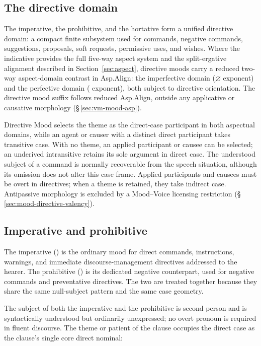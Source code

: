 \subsection{The directive domain}\label{sec:mood-directive}

The imperative, the prohibitive, and the hortative form a unified directive
domain: a compact finite subsystem used for commands, negative commands,
suggestions, proposals, soft requests, permissive uses, and wishes. Where the
indicative provides the full five-way aspect system and the split-ergative
alignment described in Section~\ref{sec:aspect}, directive moods carry a reduced
two-way aspect-domain contrast in Asp.Align: the imperfective domain
($\varnothing$ exponent) and the perfective domain
( exponent), both subject to directive orientation. The directive mood suffix follows
reduced Asp.Align, outside any applicative or causative morphology
(§\,\ref{sec:vm-mood-asp}).

Directive Mood selects the theme as the direct-case participant in both
aspectual domains, while an agent or causer with a distinct direct participant
takes transitive case. With no theme, an applied participant or causee can be
selected; an underived intransitive retains its sole argument in direct case.
The understood subject of a command is normally recoverable from the speech
situation, although its omission does not alter this case frame. Applied
participants and causees must be overt in directives; when a theme is retained,
they take indirect case. Antipassive morphology is excluded by a Mood--Voice
licensing restriction (§\,\ref{sec:mood-directive-valency}).

\subsection{Imperative and prohibitive}\label{sec:mood-imp}

The imperative () is the ordinary mood for direct commands,
instructions, warnings, and immediate discourse-management directives addressed
to the hearer. The prohibitive () is its dedicated negative counterpart,
used for negative commands and preventative directives. The two are treated
together because they share the same null-subject pattern and the same case
geometry.

The subject of both the imperative and the prohibitive is second person and is
syntactically understood but ordinarily unexpressed; no overt pronoun is
required in fluent discourse. The theme or patient of the clause occupies the
direct case as the clause's single core direct nominal:

